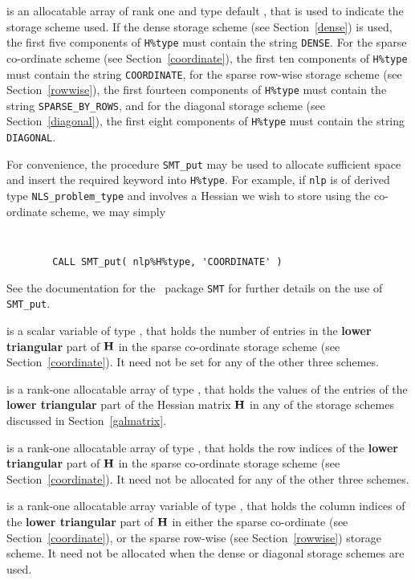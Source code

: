 \documentclass{galahad}
\newcommand{\packagename}{NLS}
\begin{document}
\begin{description}
\begin{description}
 is an allocatable array of rank one and type default
\character, that
is used to indicate the storage scheme used. If the dense storage scheme
(see Section~\ref{dense}) is used,
the first five components of {\tt H\%type} must contain the
string {\tt DENSE}.
For the sparse co-ordinate scheme (see Section~\ref{coordinate}),
the first ten components of {\tt H\%type} must contain the
string {\tt COORDINATE},
for the sparse row-wise storage scheme (see Section~\ref{rowwise}),
the first fourteen components of {\tt H\%type} must contain the
string {\tt SPARSE\_BY\_ROWS},
and for the diagonal storage scheme (see Section~\ref{diagonal}),
the first eight components of {\tt H\%type} must contain the
string {\tt DIAGONAL}.

For convenience, the procedure {\tt SMT\_put}
may be used to allocate sufficient space and insert the required keyword
into {\tt H\%type}.
For example, if {\tt nlp} is of derived type {\tt \packagename\_problem\_type}
and involves a Hessian we wish to store using the co-ordinate scheme,
we may simply
{\tt
\begin{verbatim}
        CALL SMT_put( nlp%H%type, 'COORDINATE' )
\end{verbatim}
}
\noindent
See the documentation for the \galahad\ package {\tt SMT}
for further details on the use of {\tt SMT\_put}.

 is a scalar variable of type \integer, that
holds the number of entries in the {\bf lower triangular} part of ${\mathbf{H}}$
in the sparse co-ordinate storage scheme (see Section~\ref{coordinate}).
It need not be set for any of the other three schemes.

 is a rank-one allocatable array of type \realdp, that holds
the values of the entries of the {\bf lower triangular} part
of the Hessian matrix ${\mathbf{H}}$ in any of the
storage schemes discussed in Section~\ref{galmatrix}.

 is a rank-one allocatable array of type \integer,
that holds the row indices of the {\bf lower triangular} part of ${\mathbf{H}}$
in the sparse co-ordinate storage
scheme (see Section~\ref{coordinate}).
It need not be allocated for any of the other three schemes.

 is a rank-one allocatable array variable of type \integer,
that holds the column indices of the {\bf lower triangular} part of
${\mathbf{H}}$ in either the sparse co-ordinate
(see Section~\ref{coordinate}), or the sparse row-wise
(see Section~\ref{rowwise}) storage scheme.
It need not be allocated when the dense or diagonal storage schemes are used.


\end{description}
\end{description}
\end{document}
